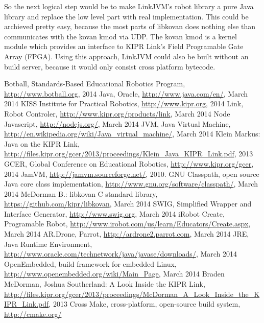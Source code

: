 \documentclass{juniorjournal}
\begin{document}
So the next logical step would be to make LinkJVM's robot library a pure Java library and replace the low level part with real implementation.
This could be archieved pretty easy, because the most parts of libkovan does nothing else than communicates with the kovan kmod via UDP.
The kovan kmod is a kernel module which provides an interface to KIPR Link's Field Programable Gate Array (FPGA).
Using this approach, LinkJVM could also be built without an build server, because it would only consist cross platform bytecode.

\begin{thebibliography}{500} %
  Botball, Standards-Based Educational Robotics Program, \url{http://www.botball.org}, 2014
  Java, Oracle, \url{http://www.java.com/en/}, March 2014
  KISS Institute for Practical Robotics, \url{http://www.kipr.org}, 2014
 Link, Robot Controler, \url{http://www.kipr.org/products/link}, March 2014
  Node Javascript, \url{http://nodejs.org/}, March 2014
  JVM, Java Virtual Machine, \url{http://en.wikipedia.org/wiki/Java\_virtual\_machine/}, March 2014
  Klein Markus: \frqq Java on the KIPR Link\flqq, \url{http://files.kipr.org/gcer/2013/proceedings/Klein\_Java\_KIPR\_Link.pdf}, 2013
  GCER, Global Conference on Educational Robotics, \url{http://www.kipr.org/gcer}, 2014
  JamVM, \url{http://jamvm.sourceforge.net/}, 2010.
  GNU Classpath, open source Java core class implementation, \url{http://www.gnu.org/software/classpath/}, March 2014
  McDorman B.: libkovan C standard library, \url{https://github.com/kipr/libkovan}, March 2014
  SWIG, Simplified Wrapper and Interface Generator, \url{http://www.swig.org}, March 2014
  iRobot Create, Programable Robot, \url{http://www.irobot.com/us/learn/Educators/Create.aspx}, March 2014
  AR.Drone, Parrot, \url{http://ardrone2.parrot.com}, March 2014
  JRE, Java Runtime Environment, \url{http://www.oracle.com/technetwork/java/javase/downloads/}, March 2014
  OpenEmbedded, build framework for embedded Linux, \url{http://www.openembedded.org/wiki/Main\_Page}, March 2014
  Braden McDorman, Joshua Southerland: \frqq A Look Inside the KIPR Link\flqq, \url{http://files.kipr.org/gcer/2013/proceedings/McDorman\_A\_Look\_Inside\_the\_KIPR\_Link.pdf}, 2013
  Cross Make, cross-platform, open-source build system, \url{http://cmake.org/}
\end{thebibliography}
\end{document}
